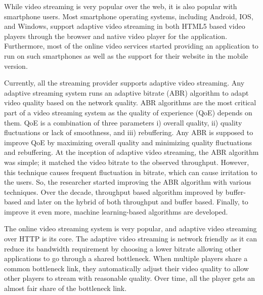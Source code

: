 While video streaming is very popular over the web, it is also popular with smartphone users. Most smartphone operating systems, including Android, IOS, and Windows, support adaptive video streaming in both HTML5 based video players through the browser and native video player for the application. Furthermore, most of the online video services started providing an application to run on such smartphones as well as the support for their website in the mobile version.

Currently, all the streaming provider supports adaptive video streaming. Any adaptive streaming system runs an adaptive bitrate (ABR) algorithm to adapt video quality based on the network quality. ABR algorithms are the most critical part of a video streaming system as the quality of experience (QoE) depends on them. QoE is a combination of three parameters i) overall quality, ii) quality fluctuations or lack of smoothness, and iii) rebuffering. Any ABR is supposed to improve QoE by maximizing overall quality and minimizing quality fluctuations and rebuffering. At the inception of adaptive video streaming, the ABR algorithm was simple; it matched the video bitrate to the observed throughput. However, this technique causes frequent fluctuation in bitrate, which can cause irritation to the users. So, the researcher started improving the ABR algorithm with various techniques. Over the decade, throughput based algorithm improved by buffer-based and later on the hybrid of both throughput and buffer based. Finally, to improve it even more, machine learning-based algorithms are developed.

The online video streaming system is very popular, and adaptive video streaming over HTTP is its core. The adaptive video streaming is network friendly as it can reduce its bandwidth requirement by choosing a lower bitrate allowing other applications to go through a shared bottleneck. When multiple players share a common bottleneck link, they automatically adjust their video quality to allow other players to stream with reasonable quality. Over time, all the player gets an almost fair share of the bottleneck link.